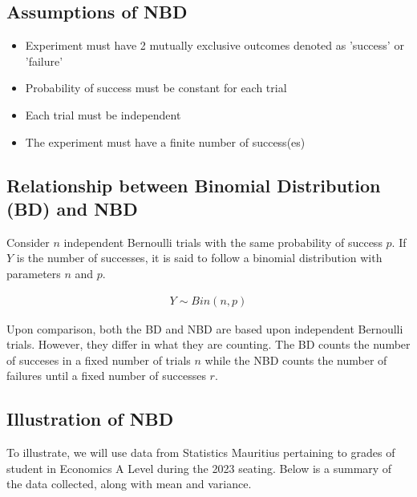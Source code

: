 \documentclass{article}
\begin{document}
\subsection{Assumptions of NBD}
\begin{itemize}
  \item Experiment must have 2 mutually exclusive outcomes denoted as
    'success' or 'failure'
  \item Probability of success must be constant for each trial
  \item Each trial must be independent
  \item The experiment must have a finite number of success(es)
\end{itemize}

\subsection{Relationship between Binomial Distribution (BD) and NBD}
Consider $ n $ independent Bernoulli trials with the same probability 
of success $ p $. If $ Y $ is the number of successes, it is said
to follow a binomial distribution with parameters $ n $ and $ p $.

\begin{gather*}
  Y \sim Bin(n, p)
\end{gather*}

Upon comparison, both the BD and NBD are based upon independent 
Bernoulli trials. However, they differ in what they are counting.
The BD counts the number of succeses in a fixed number of 
trials $ n $ while the NBD counts the number of failures until
a fixed number of successes $ r $.

\subsection{Illustration of NBD}
To illustrate, we will use data from Statistics Mauritius pertaining
to grades of student in Economics A Level during the 2023 seating.
Below is a summary of the data collected, along with mean and 
variance.
\end{document}
